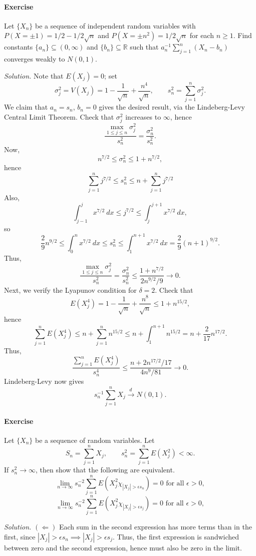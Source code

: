 \documentclass[10pt]{article}
\newcounter{prob}
\newcommand{\problem}{\stepcounter{prob}\paragraph{Exercise \arabic{prob}}}
\newcommand{\solution}{\textit{Solution.} }
\newcommand{\R}{\mathbb{R}}
\newcommand{\tod}{\overset{d\,}{\longrightarrow}}
\begin{document}
    \problem Let $\{X_n\}$ be a sequence of independent random variables with $P(X =
    \pm 1) = 1 / 2 - 1 / 2\sqrt{n}$ and $P(X = \pm n^2) = 1 / 2\sqrt{n}$ for each $n
    \geq 1$. Find constants $\{a_n\} \subseteq (0, \infty)$ and $\{b_n\} \subseteq
    \R$ such that $a_n^{-1} \sum_{j = 1}^n (X_n - b_n)$ converges weakly to $N(0,
    1)$.

    \solution Note that $E(X_j) = 0$; set \[
        \sigma_j^2 = V(X_j) = 1 - \frac{1}{\sqrt{n}} + \frac{n^4}{\sqrt{n}}, \qquad
        s_n^2 = \sum_{j = 1}^n \sigma_j^2.
    \] We claim that $a_n = s_n$, $b_n = 0$ gives the desired result, via the
    Lindeberg-Levy Central Limit Theorem. Check that $\sigma_j^2$ increases to
    $\infty$, hence \[
        \frac{\max_{1 \leq j \leq n}\sigma_j^2}{s_n^2} = \frac{\sigma_n^2}{s_n^2}.
    \] Now, \[
        n^{7 / 2} \leq \sigma_n^2 \leq 1 + n^{7 / 2},
    \] hence \[
        \sum_{j = 1}^n j^{7 / 2} \leq s_n^2 \leq n + \sum_{j = 1}^n j^{7 / 2}
    \] Also, \[
        \int_{j - 1}^j x^{7 / 2} \:dx \leq j^{7 / 2} \leq \int_j^{j + 1} x^{7 /
        2}\:dx,
    \] so \[
        \frac{2}{9} n^{9 / 2} \leq \int_0^n x^{7 / 2}\:dx \leq s_n^2 \leq \int_1^{n +
        1} x^{7 / 2}\:dx = \frac{2}{9}(n + 1)^{9 / 2}.
    \] Thus, \[
        \frac{\max_{1 \leq j \leq n}\sigma_j^2}{s_n^2} = \frac{\sigma_n^2}{s_n^2}
        \leq \frac{1 + n^{7 / 2}}{2n^{9 / 2} / 9} \to 0.
    \] Next, we verify the Lyapunov condition for $\delta = 2$. Check that \[
        E(X_j^4) = 1 - \frac{1}{\sqrt{n}} + \frac{n^8}{\sqrt{n}} \leq 1 + n^{15 / 2},
    \] hence \[
        \sum_{j = 1}^n E(X_j^4) \leq n + \sum_{j = 1}^n n^{15 / 2} \leq n + \int_1^{n
        + 1} n^{15 / 2} = n + \frac{2}{17} n^{17 / 2}.
    \] Thus, \[
        \frac{\sum_{j = 1}^n E(X_j^4)}{s_n^4} \leq \frac{n + 2n^{17 / 2} / 17}{4 n^9
        / 81} \to 0.
    \] Lindeberg-Levy now gives \[
        s_n^{-1} \sum_{j = 1}^n X_j \tod N(0, 1).
    \]



    \problem Let $\{X_n\}$ be a sequence of random variables. Let \[
        S_n = \sum_{j = 1}^n X_j, \qquad
        s_n^2 = \sum_{j = 1}^n E(X_j^2) < \infty.
    \] If $s_n^2 \to \infty$, then show that the following are equivalent. \[
        \lim_{n \to \infty} s_n^{-2} \sum_{j = 1}^n E(X_j^2 \chi_{|X_j| > \epsilon
        s_n}) = 0 \text{ for all } \epsilon > 0,
    \] \[
        \lim_{n \to \infty} s_n^{-2} \sum_{j = 1}^n E(X_j^2 \chi_{|X_j| > \epsilon
        s_j}) = 0 \text{ for all } \epsilon > 0,
    \]

    \solution $(\Leftarrow)$ Each sum in the second expression has more terms than in
    the first, since $|X_j| > \epsilon s_n \implies |X_j| > \epsilon s_j$. Thus, the
    first expression is sandwiched between zero and the second expression, hence must
    also be zero in the limit.
\end{document}
